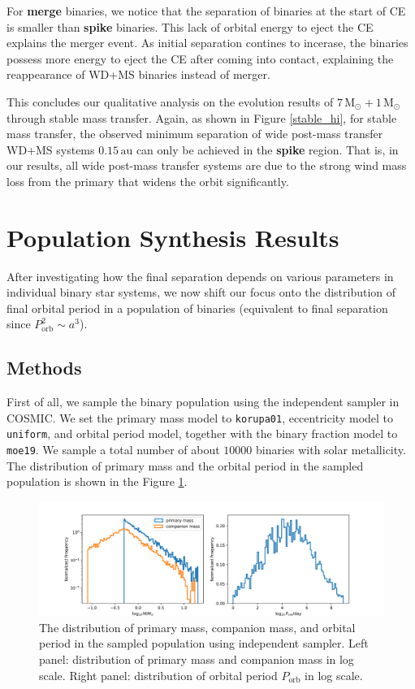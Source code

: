 \documentclass[12pt]{article}
\newcommand{\Msun}{\,\mathrm{M_{\odot}}}
\newcommand{\Porb}{P_{\mathrm{orb}}}
\newcommand{\au}{\, \mathrm{au}}
\begin{document}
For \textbf{merge} binaries, we notice that the separation of binaries at the start of CE is smaller than \textbf{spike} binaries. This lack of orbital energy to eject the CE explains the merger event. As initial separation contines to incerase, the binaries possess more energy to eject the CE after coming into contact, explaining the reappearance of WD+MS binaries instead of merger.

This concludes our qualitative analysis on the evolution results of $7\Msun + 1\Msun$ through stable mass transfer. Again, as shown in Figure \ref{stable_hi}, for stable mass transfer, the observed minimum separation of wide post-mass transfer WD+MS systems $0.15 \au$ can only be achieved in the \textbf{spike} region. That is, in our results, all wide post-mass transfer systems are due to the strong wind mass loss from the primary that widens the orbit significantly.

\section{Population Synthesis Results} \label{sec:population}
After investigating how the final separation depends on various parameters in individual binary star systems, we now shift our focus onto the distribution of final orbital period in a population of binaries (equivalent to final separation since $\Porb^2 \sim a^3$).

\subsection{Methods}
First of all, we sample the binary population using the independent sampler in COSMIC. We set the primary mass model to \verb|korupa01|, eccentricity model to \verb|uniform|, and orbital period model, together with the binary fraction model to \verb|moe19|. We sample a total number of about $10000$ binaries with solar metallicity. The distribution of primary mass and the orbital period in the sampled population is shown in the Figure \ref{sample-distribution}.

\begin{figure}
  \centering
  \includegraphics[width=\linewidth]{fig/sample-distribution.png}
  \caption{The distribution of primary mass, companion mass, and orbital period in the sampled population using independent sampler. Left panel: distribution of primary mass and companion mass in log scale. Right panel: distribution of orbital period $\Porb$ in log scale.}
  \label{sample-distribution}
\end{figure}
\end{document}
